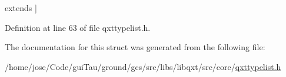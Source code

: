 \begin{Desc}
\begin{description}
{\hypertarget{struct_qxt_type_1_1_qxt_type_list_3_01_no_extend_00_01_no_extend_00_01_no_extend_00_01_no_extenda7fddf7e57fdf60b2427454b96876017_ad5ced648ab37c5852f4cf40715ad9b6aa89d52d96b7180b21857b5b36a63b6d70}{extends}\label{struct_qxt_type_1_1_qxt_type_list_3_01_no_extend_00_01_no_extend_00_01_no_extend_00_01_no_extenda7fddf7e57fdf60b2427454b96876017_ad5ced648ab37c5852f4cf40715ad9b6aa89d52d96b7180b21857b5b36a63b6d70}
}]\end{description}
\end{Desc}


Definition at line 63 of file qxttypelist.\-h.



The documentation for this struct was generated from the following file\-:\begin{DoxyCompactItemize}
\item 
/home/jose/\-Code/gui\-Tau/ground/gcs/src/libs/libqxt/src/core/\hyperlink{qxttypelist_8h}{qxttypelist.\-h}\end{DoxyCompactItemize}
